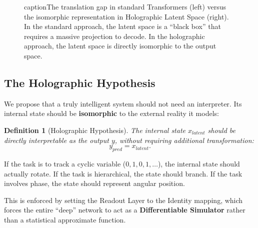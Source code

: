 \documentclass[12pt,letterpaper,twoside]{article}
\newtheorem{definition}{Definition}[section]
\begin{document}
\begin{figure}[htbp]
caption{The translation gap in standard Transformers (left) versus the isomorphic representation in Holographic Latent Space (right). In the standard approach, the latent space is a ``black box'' that requires a massive projection to decode. In the holographic approach, the latent space is directly isomorphic to the output space.}
\label{fig:translation-gap}
\end{figure}

\subsection{The Holographic Hypothesis}

We propose that a truly intelligent system should not need an interpreter. Its internal state should be \textbf{isomorphic} to the external reality it models:

\begin{definition}[Holographic Hypothesis]
The internal state $x_{latent}$ should be directly interpretable as the output $y$, without requiring additional transformation:
\[
y_{pred} = x_{latent}.
\]
\end{definition}

If the task is to track a cyclic variable ($0, 1, 0, 1, \ldots$), the internal state should actually rotate. If the task is hierarchical, the state should branch. If the task involves phase, the state should represent angular position.

This is enforced by setting the Readout Layer to the Identity mapping, which forces the entire ``deep'' network to act as a \textbf{Differentiable Simulator} rather than a statistical approximate function.
\end{document}
